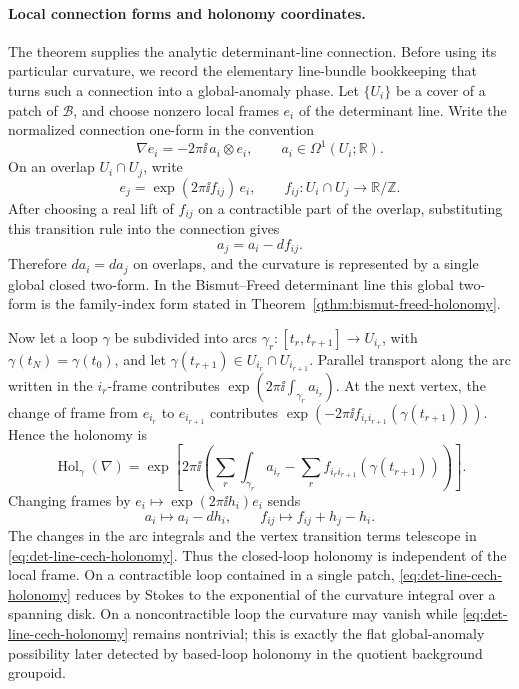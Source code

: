 \paragraph{Local connection forms and holonomy coordinates.}
The theorem supplies the analytic determinant-line connection.  Before using
its particular curvature, we record the elementary line-bundle bookkeeping
that turns such a connection into a global-anomaly phase.  Let
\(\{U_i\}\) be a cover of a patch of \(\mathcal B\), and choose nonzero local
frames \(e_i\) of the determinant line.  Write the normalized connection
one-form in the convention
\[
  \nabla e_i=-2\pi\ii\,a_i\otimes e_i,
  \qquad a_i\in\Omega^1(U_i;\mathbb R).
\]
On an overlap \(U_i\cap U_j\), write
\[
  e_j=\exp(2\pi\ii f_{ij})\,e_i,
  \qquad f_{ij}:U_i\cap U_j\longrightarrow \mathbb R/\mathbb Z .
\]
After choosing a real lift of \(f_{ij}\) on a contractible part of the
overlap, substituting this transition rule into the connection gives
\begin{equation}
  a_j=a_i-df_{ij}.
  \label{eq:det-line-local-connection-transition}
\end{equation}
Therefore \(da_i=da_j\) on overlaps, and the curvature is represented by a
single global closed two-form.  In the Bismut--Freed determinant line this
global two-form is the family-index form stated in
Theorem~\ref{qthm:bismut-freed-holonomy}.

Now let a loop \(\gamma\) be subdivided into arcs
\(\gamma_r:[t_r,t_{r+1}]\to U_{i_r}\), with
\(\gamma(t_N)=\gamma(t_0)\), and let
\(\gamma(t_{r+1})\in U_{i_r}\cap U_{i_{r+1}}\).  Parallel transport along the
arc written in the \(i_r\)-frame contributes
\(\exp(2\pi\ii\int_{\gamma_r}a_{i_r})\).  At the next vertex, the change of
frame from \(e_{i_r}\) to \(e_{i_{r+1}}\) contributes
\(\exp(-2\pi\ii f_{i_r i_{r+1}}(\gamma(t_{r+1})))\).  Hence the holonomy is
\begin{equation}
  \operatorname{Hol}_\gamma(\nabla)
  =
  \exp\left[
    2\pi\ii\left(
      \sum_r\int_{\gamma_r}a_{i_r}
      -
      \sum_r f_{i_r i_{r+1}}(\gamma(t_{r+1}))
    \right)
  \right].
  \label{eq:det-line-cech-holonomy}
\end{equation}
Changing frames by \(e_i\mapsto \exp(2\pi\ii h_i)e_i\) sends
\[
  a_i\mapsto a_i-dh_i,\qquad
  f_{ij}\mapsto f_{ij}+h_j-h_i .
\]
The changes in the arc integrals and the vertex transition terms telescope in
\eqref{eq:det-line-cech-holonomy}.  Thus the closed-loop holonomy is
independent of the local frame.  On a contractible loop contained in a
single patch, \eqref{eq:det-line-cech-holonomy} reduces by Stokes to the
exponential of the curvature integral over a spanning disk.  On a
noncontractible loop the curvature may vanish while
\eqref{eq:det-line-cech-holonomy} remains nontrivial; this is exactly the
flat global-anomaly possibility later detected by based-loop holonomy in the
quotient background groupoid.

